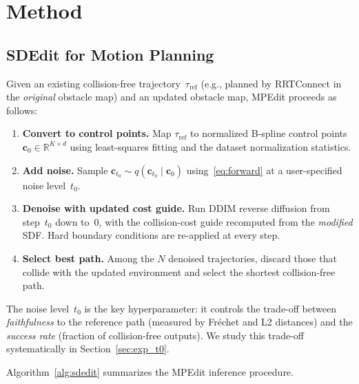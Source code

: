 \documentclass[12pt]{article}
\begin{document}
\section{Method}
\label{sec:method}

\subsection{SDEdit for Motion Planning}
\label{sec:sdedit_mp}

Given an existing collision-free trajectory~$\tau_\text{ref}$ (e.g., planned
by RRTConnect in the \emph{original} obstacle map) and an updated obstacle
map, MPEdit proceeds as follows:

\begin{enumerate}
  \item \textbf{Convert to control points.}  Map $\tau_\text{ref}$ to
        normalized B-spline control points
        $\mathbf{c}_0 \in \mathbb{R}^{K\times d}$ using least-squares fitting
        and the dataset normalization statistics.
  \item \textbf{Add noise.}  Sample
        $\mathbf{c}_{t_0} \sim q(\mathbf{c}_{t_0}\mid\mathbf{c}_0)$
        using~\eqref{eq:forward} at a user-specified noise level~$t_0$.
  \item \textbf{Denoise with updated cost guide.}  Run DDIM reverse
        diffusion from step~$t_0$ down to~$0$, with the collision-cost guide
        recomputed from the \emph{modified} SDF.  Hard boundary conditions
        are re-applied at every step.
  \item \textbf{Select best path.}  Among the $N$ denoised trajectories,
        discard those that collide with the updated environment and select the
        shortest collision-free path.
\end{enumerate}

The noise level~$t_0$ is the key hyperparameter: it controls the trade-off
between \emph{faithfulness} to the reference path (measured by Fréchet and
L2 distances) and the \emph{success rate} (fraction of collision-free
outputs).  We study this trade-off systematically in
Section~\ref{sec:exp_t0}.

Algorithm~\ref{alg:sdedit} summarizes the MPEdit inference procedure.
\end{document}
